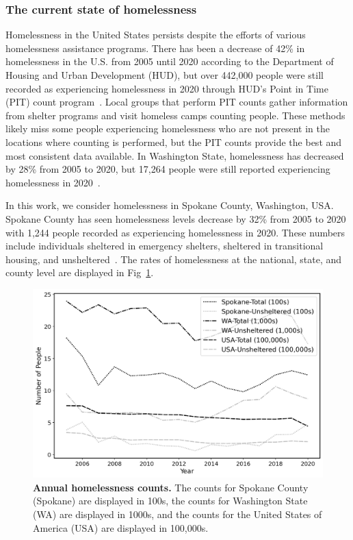 \documentclass[10pt,letterpaper]{article}
\begin{document}
\subsubsection*{The current state of homelessness}
Homelessness in the United States persists despite the efforts of various homelessness assistance programs. There has been a decrease of 42\% in homelessness in the U.S. from 2005 until 2020 according to the Department of Housing and Urban Development (HUD), but over 442,000 people were still recorded as experiencing homelessness in 2020 through HUD's Point in Time (PIT) count program~\cite{PITcount}. Local groups that perform PIT counts gather information from shelter programs and visit homeless camps counting people. These methods likely miss some people experiencing homelessness who are not present in the locations where counting is performed, but the PIT counts provide the best and most consistent data available. In Washington State, homelessness has decreased by 28\% from 2005 to 2020, but 17,264 people were still reported experiencing homelessness in 2020~\cite{PITcount}.

In this work, we consider homelessness in Spokane County, Washington, USA.  Spokane County has seen homelessness levels decrease by 32\% from 2005 to 2020 with 1,244 people recorded as experiencing homelessness in 2020. These numbers include individuals sheltered in emergency shelters, sheltered in transitional housing, and unsheltered~\cite{PITcount}. The rates of homelessness at the national, state, and county level are displayed in Fig~\ref{fig:homelessness_counts}.

\begin{figure}[!h]
    \centering
    \includegraphics[width=\textwidth]{Fig1.png} %
    \caption{{\bf Annual homelessness counts.} The counts for Spokane County (Spokane) are displayed in 100s, the counts for Washington State (WA) are displayed in 1000s, and the counts for the United States of America (USA) are displayed in 100,000s.~\cite{PITcount}}
    \label{fig:homelessness_counts}
\end{figure}
\end{document}
